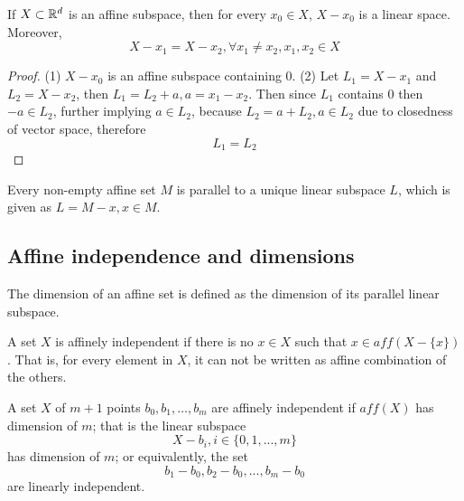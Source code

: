 \begin{refsection}
\begin{lemma}
	If $X\subset \mathbb{R}^d$ is an affine subspace, then for every $x_0\in X$, $X-x_0$ is a linear space. Moreover, 
	$$X-x_1 = X-x_2,\forall x_1\neq x_2, x_1,x_2\in X$$
\end{lemma}
\begin{proof}
(1) $X-x_0$ is an affine subspace containing 0.
(2) Let $L_1 = X - x_1$ and $L_2 = X-x_2$, then $L_1 = L_2 + a,a=x_1-x_2$. Then since $L_1$ contains $0$ then $-a \in L_2$, further implying $a\in L_2$, because $L_2 = a+L_2,a\in L_2$ due to closedness of vector space, therefore
$$L_1=L_2$$
\end{proof}


\begin{corollary}
Every non-empty affine set $M$ is parallel to a unique linear subspace $L$, which is given as $L=M-x,x\in M$. 
\end{corollary}





\subsection{Affine independence and dimensions}
\begin{definition}\cite[4]{rockafellar1997convex}
The dimension of an affine set is defined as the dimension of its parallel linear subspace.
\end{definition}


\begin{definition}
A set $X$ is affinely independent if there is no $x\in X$ such that $x\in aff(X-\{x\})$. That is, for every element in $X$, it can not be written as affine combination of the others. 
\end{definition}

\begin{definition}\cite[7]{rockafellar1997convex}
A set $X$ of $m+1$ points $b_0,b_1,...,b_m$ are affinely independent if $aff(X)$ has dimension of $m$; that is the linear subspace 
$$X-b_i,i\in \{0,1,...,m\}$$
has dimension of $m$; or equivalently, the set
$$b_1-b_0,b_2-b_0,...,b_m-b_0$$ are linearly independent.
\end{definition}


\end{refsection}
